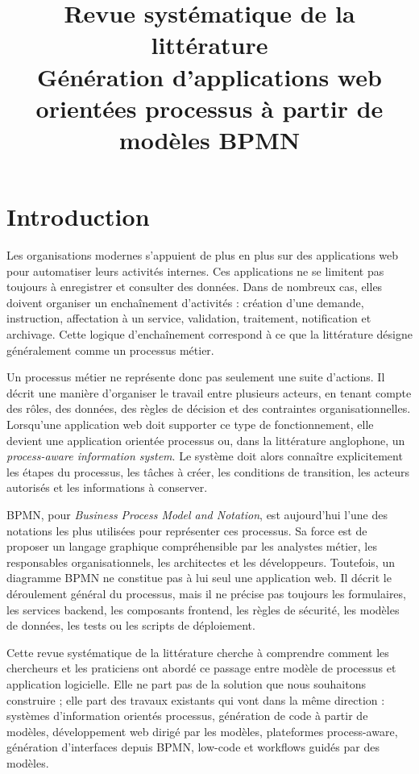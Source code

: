 \documentclass[12pt,a4paper]{article}
\title{Revue systématique de la littérature\\
\large Génération d'applications web orientées processus à partir de modèles BPMN}
\author{}
\date{}
\begin{document}
\maketitle

\section{Introduction}

Les organisations modernes s'appuient de plus en plus sur des applications web pour automatiser leurs activités internes. Ces applications ne se limitent pas toujours à enregistrer et consulter des données. Dans de nombreux cas, elles doivent organiser un enchaînement d'activités : création d'une demande, instruction, affectation à un service, validation, traitement, notification et archivage. Cette logique d'enchaînement correspond à ce que la littérature désigne généralement comme un processus métier.

Un processus métier ne représente donc pas seulement une suite d'actions. Il décrit une manière d'organiser le travail entre plusieurs acteurs, en tenant compte des rôles, des données, des règles de décision et des contraintes organisationnelles. Lorsqu'une application web doit supporter ce type de fonctionnement, elle devient une application orientée processus ou, dans la littérature anglophone, un \textit{process-aware information system}. Le système doit alors connaître explicitement les étapes du processus, les tâches à créer, les conditions de transition, les acteurs autorisés et les informations à conserver.

BPMN, pour \textit{Business Process Model and Notation}, est aujourd'hui l'une des notations les plus utilisées pour représenter ces processus. Sa force est de proposer un langage graphique compréhensible par les analystes métier, les responsables organisationnels, les architectes et les développeurs. Toutefois, un diagramme BPMN ne constitue pas à lui seul une application web. Il décrit le déroulement général du processus, mais il ne précise pas toujours les formulaires, les services backend, les composants frontend, les règles de sécurité, les modèles de données, les tests ou les scripts de déploiement.

Cette revue systématique de la littérature cherche à comprendre comment les chercheurs et les praticiens ont abordé ce passage entre modèle de processus et application logicielle. Elle ne part pas de la solution que nous souhaitons construire ; elle part des travaux existants qui vont dans la même direction : systèmes d'information orientés processus, génération de code à partir de modèles, développement web dirigé par les modèles, plateformes process-aware, génération d'interfaces depuis BPMN, low-code et workflows guidés par des modèles.
\end{document}
